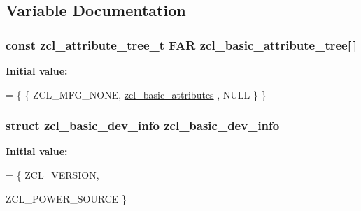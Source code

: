\subsection{Variable Documentation}
\hypertarget{group__zcl__basic_ga465778a2b459ad01710dc8f69ec2c19b}{
\subsubsection[{zcl\-\_\-basic\-\_\-attribute\-\_\-tree}]{\setlength{\rightskip}{0pt plus 5cm}const {\bf zcl\-\_\-attribute\-\_\-tree\-\_\-t} {\bf F\-A\-R} zcl\-\_\-basic\-\_\-attribute\-\_\-tree\mbox{[}$\,$\mbox{]}}}\label{group__zcl__basic_ga465778a2b459ad01710dc8f69ec2c19b}
{\bfseries Initial value\-:}
\begin{DoxyCode}
=
                           \{ \{ ZCL\_MFG\_NONE, \hyperlink{group__zcl__basic_ga721ebe2f6ae346632475cf178671d150}{zcl\_basic\_attributes}
      , NULL \} \}
\end{DoxyCode}
\hypertarget{group__zcl__basic_gade7b2cef364fe9b09f23eb85bd2f61de}{
\subsubsection[{zcl\-\_\-basic\-\_\-dev\-\_\-info}]{\setlength{\rightskip}{0pt plus 5cm}struct {\bf zcl\-\_\-basic\-\_\-dev\-\_\-info}  {\bf zcl\-\_\-basic\-\_\-dev\-\_\-info}}}\label{group__zcl__basic_gade7b2cef364fe9b09f23eb85bd2f61de}
{\bfseries Initial value\-:}
\begin{DoxyCode}
= \{
   \hyperlink{group__zcl__basic_ga677e87e13981dedcd3b370ede4902c54}{ZCL\_VERSION},









   ZCL\_POWER\_SOURCE
\}
\end{DoxyCode}
